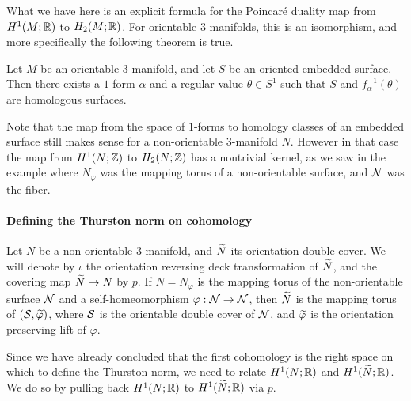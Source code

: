 What we have here is an explicit formula for the Poincar\'e duality map from $H^1(M; \mathbb{R})$ to $H_2(M; \mathbb{R})$.
For orientable $3$-manifolds, this is an isomorphism, and more specifically the following theorem is true.
\begin{thm}
  \label{thm:orientable-poincare-duality}
  Let $M$ be an orientable $3$-manifold, and let $S$ be an oriented embedded surface. Then there exists a $1$-form
  $\alpha$ and a regular value $\theta \in S^1$ such that $S$ and $f_{\alpha}^{-1}(\theta)$ are homologous surfaces.
\end{thm}

Note that the map from the space of $1$-forms to homology classes of an embedded surface still makes sense for a non-orientable $3$-manifold $N$.
However in that case the map from $H^1(N; \mathbb{Z})$ to $H_2(N; \mathbb{Z})$ has a nontrivial kernel, as we saw in the example where $N_{\varphi}$ was the mapping torus of a non-orientable surface, and $\mathcal{N}$ was the fiber.

\paragraph{Defining the Thurston norm on cohomology}
Let $N$ be a non-orientable $3$-manifold, and $\widetilde{N}$ its orientation double cover.
We will denote by $\iota$ the orientation reversing deck transformation
of $\widetilde{N}$, and the covering map $\widetilde{N} \to N$ by $p$.
If $N=N_\varphi$ is the mapping torus of the non-orientable surface $\mathcal{N}$ and a self-homeomorphism $\varphi: \mathcal{N} \to \mathcal{N}$, then $\widetilde{N}$ is the mapping torus of $(\mathcal{S}, \widetilde{\varphi})$, where $\mathcal{S}$ is the orientable double cover of $\mathcal{N}$, and $\widetilde{\varphi}$ is the orientation preserving lift of $\varphi$.

Since we have already concluded that the first cohomology is the right space on which to define the Thurston norm, we need to relate $H^1(N; \mathbb{R})$ and $H^1(\widetilde{N}; \mathbb{R})$.
We do so by pulling back $H^1(N;\mathbb{R})$ to $H^1(\widetilde{N};\mathbb{R})$ via $p$.


